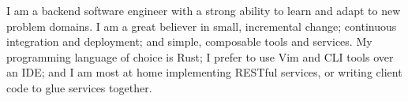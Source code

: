 \documentclass[9pt]{developercv} %
\begin{document}
\vspace{0.5cm}



\begin{minipage}[t]{0.4\textwidth} %
	\vspace{-\baselineskip} %
	

	I am a backend software engineer with a strong ability to learn and adapt to new problem domains.
	I am a great believer in small, incremental change; continuous integration and deployment; and simple, composable tools and services.
	My programming language of choice is Rust; I prefer to use Vim and CLI tools over an IDE; and I am most at home implementing RESTful services, or writing client code to glue services together.
\end{minipage}
\hfill %
\begin{minipage}[t]{0.5\textwidth} %
	\vspace{-\baselineskip} %
	\begin{barchart}{5.5}
	\end{barchart}
\end{minipage}



\end{document}
